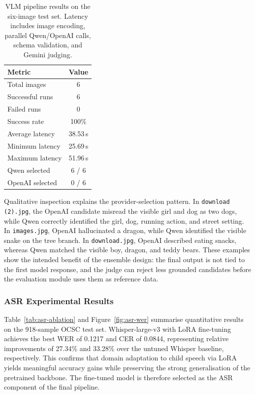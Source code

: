\documentclass{article}
\begin{document}
\begin{table}[t]
\centering
\caption{VLM pipeline results on the six-image test set. Latency
includes image encoding, parallel Qwen/OpenAI calls, schema validation,
and Gemini judging.}
\label{tab:vlm-quantitative}
\scriptsize
\setlength{\tabcolsep}{6pt}
\begin{tabular}{lc}
\toprule
\textbf{Metric} & \textbf{Value}\\
\midrule
Total images & 6\\
Successful runs & 6\\
Failed runs & 0\\
Success rate & 100\%\\
Average latency & 38.53\,s\\
Minimum latency & 25.69\,s\\
Maximum latency & 51.96\,s\\
Qwen selected & 6 / 6\\
OpenAI selected & 0 / 6\\
\bottomrule
\end{tabular}
\end{table}

Qualitative inspection explains the provider-selection pattern. In
\texttt{download (2).jpg}, the OpenAI candidate misread the visible girl
and dog as two dogs, while Qwen correctly identified the girl, dog,
running action, and street setting. In \texttt{images.jpg}, OpenAI
hallucinated a dragon, while Qwen identified the visible snake on the
tree branch. In \texttt{download.jpg}, OpenAI described eating snacks,
whereas Qwen matched the visible boy, dragon, and teddy bears. These
examples show the intended benefit of the ensemble design: the final
output is not tied to the first model response, and the judge can reject
less grounded candidates before the evaluation module uses them as
reference data.

\subsubsection{ASR Experimental Results}
\label{sec:asr-results}
 
Table~\ref{tab:asr-ablation} and Figure~\ref{fig:asr-wer} summarise
quantitative results on the 918-sample OCSC test set.
Whisper-large-v3 with LoRA fine-tuning achieves the best WER of
0.1217 and CER of 0.0844, representing relative improvements of
27.34\% and 33.28\% over the untuned Whisper baseline, respectively.
This confirms that domain adaptation to child speech via LoRA yields
meaningful accuracy gains while preserving the strong generalisation
of the pretrained backbone.
The fine-tuned model is therefore selected as the ASR component of
the final pipeline.
\end{document}
